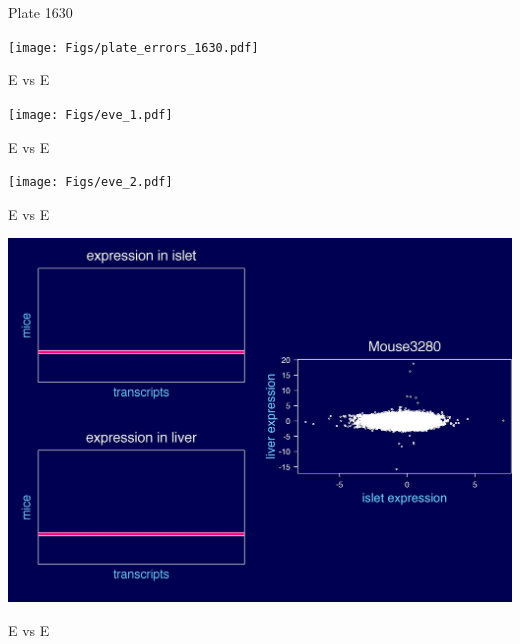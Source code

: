 \documentclass[12pt]{article}
\newcommand{\headsize}{\fontsize{35}{35} \selectfont}
\begin{document}
\newpage


\headsize \color{myyellow}
\hfill \begin{minipage}{5.75in}
\centering
Plate 1630
\end{minipage}

\vfill

\centerline{\texttt{[image: Figs/plate\_errors\_1630.pdf]}}

\newpage


\headsize \color{myyellow}
\hfill \begin{minipage}{5.75in}
\centering
E vs E
\end{minipage}

\vfill

\centerline{\texttt{[image: Figs/eve\_1.pdf]}}

\newpage

\headsize \color{myyellow}
\hfill \begin{minipage}{5.75in}
\centering
E vs E
\end{minipage}

\vfill

\centerline{\texttt{[image: Figs/eve\_2.pdf]}}

\newpage

\headsize \color{myyellow}
\hfill \begin{minipage}{5.75in}
\centering
E vs E
\end{minipage}

\vfill

\centerline{\includegraphics{Figs/eve_3.jpg}}


\newpage

\headsize \color{myyellow}
\hfill \begin{minipage}{5.75in}
\centering
E vs E
\end{minipage}
\end{document}
